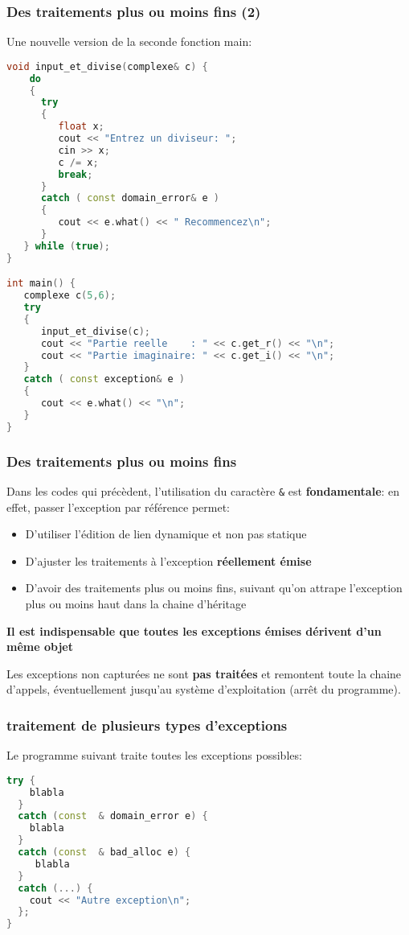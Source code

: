 \documentclass{beamer}
\begin{document}
\begin{frame}[fragile=singleslide,shrink=20]
\frametitle {Des traitements plus ou moins fins (2)}

Une nouvelle version de la seconde fonction main:
\begin{lstlisting}[language=c++]
void input_et_divise(complexe& c) {
	do
	{
      try
      {
         float x;
         cout << "Entrez un diviseur: ";
         cin >> x;
         c /= x;
         break;
      }
      catch ( const domain_error& e )
      {
         cout << e.what() << " Recommencez\n";
      }
   } while (true);
}

int main() {
   complexe c(5,6);
   try
   {
      input_et_divise(c);
      cout << "Partie reelle    : " << c.get_r() << "\n";
      cout << "Partie imaginaire: " << c.get_i() << "\n";
   }
   catch ( const exception& e )
   {
      cout << e.what() << "\n";
   }
}
\end{lstlisting}
\end{frame}

\begin{frame}[fragile=singleslide,shrink=20]
\frametitle {Des traitements plus ou moins fins}

Dans les codes qui précèdent, l'utilisation du caractère \texttt{\&} est \textbf{fondamentale}: en effet, passer l'exception par 
référence permet:

\begin{itemize}
\item{D'utiliser l'édition de lien dynamique et non pas statique}
\item{D'ajuster les traitements à l'exception \textbf{réellement émise}}
\item{D'avoir des traitements plus ou moins fins, suivant qu'on attrape l'exception plus ou moins haut dans la 
chaine d'héritage}
\end{itemize}

\textbf{Il est indispensable que toutes les exceptions émises dérivent d'un même objet}

Les exceptions non capturées ne sont \textbf{pas traitées} et remontent toute la chaine d'appels, 
éventuellement jusqu'au système d'exploitation (arrêt du programme).

\end{frame}

\begin{frame}[fragile=singleslide,shrink=20]
\frametitle {traitement de plusieurs types d'exceptions}

Le programme suivant traite toutes les exceptions possibles:
\begin{lstlisting}[language=c++]
try {
    blabla
  }
  catch (const  & domain_error e) {
    blabla
  }
  catch (const  & bad_alloc e) {
     blabla
  }  
  catch (...) {
    cout << "Autre exception\n";
  };
} 
\end{lstlisting}
\end{frame}
\end{document}
